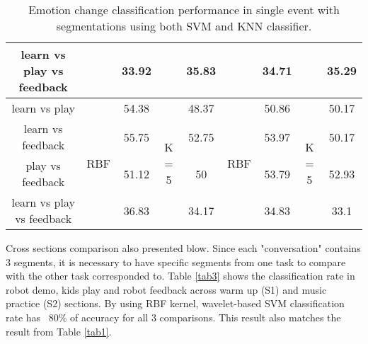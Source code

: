\begin{sidewaystable}[tbp]
\begin{center}
{\begin{tabular}{ccccccccc}
			learn vs play vs feedback                                 &                             & 33.92    &                        & 35.83    &                             & 34.71    &                        & 35.29    \\
			\hline
			learn vs play                                   & \multirow{4}{*}{RBF}        & 54.38    & \multirow{4}{*}{K = 5} & 48.37    & \multirow{4}{*}{RBF}        & 50.86    & \multirow{4}{*}{K = 5} & 50.17    \\
			learn vs feedback                                   &                             & 55.75    &                        & 52.75    &                             & 53.97    &                        & 50.17    \\
			play vs feedback                                   &                             & 51.12    &                        & 50       &                             & 53.79    &                        & 52.93    \\
			learn vs play vs feedback                                 &                             & 36.83    &                        & 34.17    &                             & 34.83    &                        & 33.1    \\
			\hline
		\end{tabular}

	}
		\caption{Emotion change classification performance in single event with segmentations using both SVM and KNN classifier. }\label{tab2}
	\end{center}
\end{sidewaystable}

Cross sections comparison also presented blow. Since each "conversation" contains 3 segments, it is 
necessary to have specific segments from one task to compare with the other task corresponded to. 
Table \ref{tab3} shows the classification rate in robot demo, kids play and robot feedback across
warm up (S1) and music practice (S2) sections. By using RBF kernel, wavelet-based SVM classification rate has
~80\% of accuracy for all 3 comparisons. This result also matches the result from Table \ref{tab1}. 

